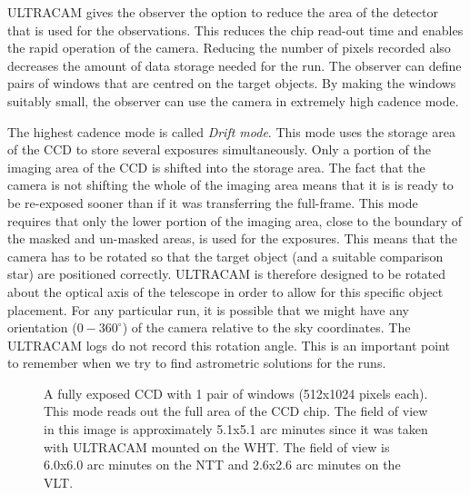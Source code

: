 ULTRACAM gives the observer the option to reduce the area of the detector that is used for the observations. This reduces the chip read-out time and enables the rapid operation of the camera. Reducing the number of pixels recorded also decreases the amount of data storage needed for the run. The observer can define pairs of windows that are centred on the target objects. By making the windows suitably small, the observer can use the camera in extremely high cadence mode. 

The highest cadence mode is called \emph{Drift mode}. This mode uses the storage area of the CCD to store several exposures simultaneously. Only a portion of the imaging area of the CCD is shifted into the storage area. The fact that the camera is not shifting the whole of the imaging area means that it is is ready to be re-exposed sooner than if it was transferring the full-frame. This mode requires that only the lower portion of the imaging area, close to the boundary of the masked and un-masked areas, is used for the exposures. This means that the camera has to be rotated so that the target object (and a suitable comparison star) are positioned correctly. ULTRACAM is therefore designed to be rotated about the optical axis of the telescope in order to allow for this specific object placement. For any particular run, it is possible that we might have any orientation ($0-360^{\circ}$) of the camera relative to the sky coordinates. The ULTRACAM logs do not record this rotation angle. This is an important point to remember when we try to find astrometric solutions for the runs.    

\begin{figure}
  \centering
  \setlength{\fboxsep}{0pt}
  \setlength{\fboxrule}{1pt}
  \caption{A fully exposed CCD with 1 pair of windows (512x1024 pixels each).  This mode reads out the full area of the CCD chip. The field of view in this image is approximately 5.1x5.1 arc minutes since it was taken with ULTRACAM mounted on the WHT. The field of view is 6.0x6.0 arc minutes on the NTT and 2.6x2.6 arc minutes on the VLT.}
  \label{fig:KOI-824}
\end{figure}

